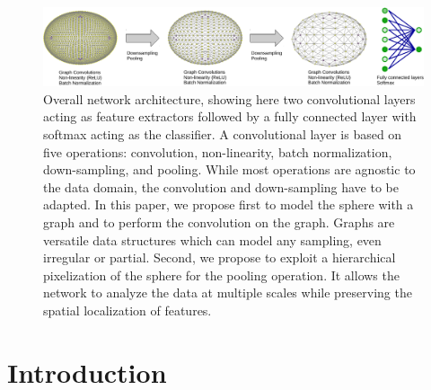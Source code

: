 \documentclass[final,twocolumn,3p,times,authoryear]{elsarticle}
\newcommand{\nati}[1]{{\color[rgb]{.1,.6,.1}{#1}}}
\newcommand{\1}{\b{1}}              %
\newcommand{\0}{\b{0}}              %
\begin{document}
\begin{figure}[!ht]
	\centering
	\includegraphics[width=\linewidth]{figures/architecture}
	\caption{Overall network architecture, showing here two convolutional layers acting as feature extractors followed by a fully connected layer with softmax acting as the classifier. A convolutional layer is based on five operations: convolution, non-linearity, batch normalization, down-sampling, and pooling. While most operations are agnostic to the data domain, the convolution and down-sampling have to be adapted. In this paper, we propose first to model the sphere with a graph and to perform the convolution on the graph. Graphs are versatile data structures which can model any sampling, even irregular or partial. Second, we propose to exploit a hierarchical pixelization of the sphere for the pooling operation. It allows the network to analyze the data at multiple scales while preserving the spatial localization of features.
    \nati{Great plot! Could you make the sphere round? If you use the current code in paper plot, they will be.}
    }
\end{figure}

\section{Introduction}
\label{sec:intro}

\end{document}
